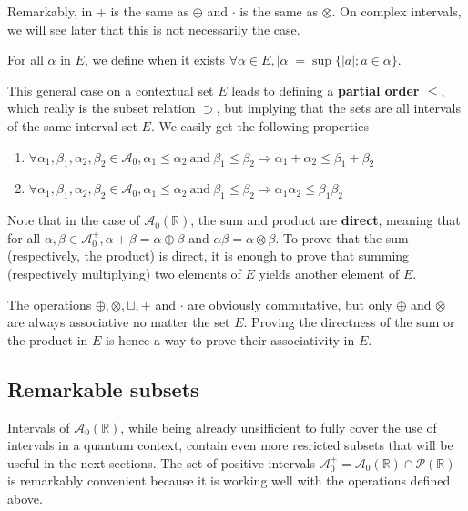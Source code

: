 \noindent Remarkably, in + is the same as $\oplus$ and $\cdot$ is the same as $\otimes$. On complex intervals, we will see later that this is not necessarily the case.

\begin{definition}[modulus]
    For all $\alpha$ in $E$, we define when it exists
   $\forall \alpha \in E, |\alpha| = \sup\{|a| ; a \in \alpha\}$.
\end{definition}

This general case on a contextual set $E$ leads to defining a \textbf{partial order $\le$}, which really is the subset relation $\supset$, but implying that the sets are all intervals of the same interval set $E$. We easily get the following properties
\begin{enumerate}[i]
    \item $\forall \alpha_1, \beta_1, \alpha_2, \beta_2 \in \mathcal{A}_0, \alpha_1 \le \alpha_2 ~\text{and}~ \beta_1 \le \beta_2 \Rightarrow \alpha_1 + \alpha_2 \le \beta_1 + \beta_2$
    \item $\forall \alpha_1, \beta_1, \alpha_2, \beta_2 \in \mathcal{A}_0, \alpha_1 \le \alpha_2 ~\text{and}~ \beta_1 \le \beta_2 \Rightarrow \alpha_1 \alpha_2 \le \beta_1 \beta_2$
\end{enumerate}

Note that in the case of $\mathcal{A}_0(\mathbb{R})$, the sum and product are \textbf{direct}, meaning that for all $\alpha, \beta \in \mathcal{A}_0^+, \alpha + \beta = \alpha \oplus \beta$ and $\alpha \beta = \alpha \otimes \beta$. To prove that the sum (respectively, the product) is direct, it is enough to prove that summing (respectively multiplying) two elements of $E$ yields another element of $E$.

The operations $\oplus, \otimes, \sqcup, +$ and $\cdot$ are obviously commutative, but only $\oplus$ and $\otimes$ are always associative no matter the set $E$. Proving the directness of the sum or the product in $E$ is hence a way to prove their associativity in $E$.

\subsection{Remarkable subsets}

Intervals of $\mathcal{A}_0(\mathbb{R})$, while being already unsifficient to fully cover the use of intervals in a quantum context, contain even more resricted subsets that will be useful in the next sections. The set of positive intervals $\mathcal{A}_0^+ = \mathcal{A}_0(\mathbb{R}) \cap \mathcal{P}(\mathbb{R})$ is remarkably convenient because it is working well with the operations defined above.

